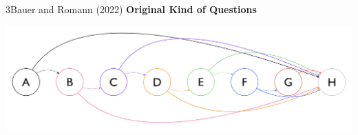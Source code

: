 \documentclass[xcolor=table,9pt,aspectratio=169]{beamer}
\begin{document}
\begin{frame}{\vspace*{10mm}3\hspace*{1em}Bauer and Romann (2022)}
\vspace*{-5mm}
\textbf{Original Kind of Questions}\\
\begin{center}
   \includegraphics[width=.8\linewidth]{figures/combinations_3.pdf}
\end{center}
\end{frame}
\end{document}
